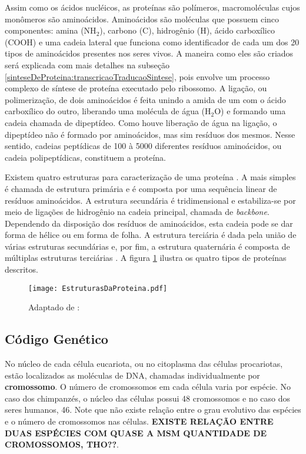 \indent Assim como os ácidos nucléicos, as proteínas são polímeros, macromoléculas cujos monômeros são aminoácidos. Aminoácidos são moléculas que possuem cinco componentes: amina (NH$_{2}$), carbono (C), hidrogênio (H), ácido carboxílico (COOH) e uma cadeia lateral que funciona como identificador de cada um dos 20 tipos de aminoácidos presentes nos seres vivos. A maneira como eles são criados será explicada com mais detalhes na subseção \ref{sinteseDeProteina:transcricaoTraducaoSintese}, pois envolve um processo complexo de síntese de proteína executado pelo ribossomo. A ligação, ou polimerização, de dois aminoácidos é feita unindo a amida de um com o ácido carboxílico do outro, liberando uma molécula de água (H$_{2}$O) e formando uma cadeia chamada de dipeptídeo. Como houve liberação de água na ligação, o dipeptídeo não é formado por aminoácidos, mas sim resíduos dos mesmos. Nesse sentido, cadeias peptídicas de 100 à 5000 diferentes resíduos aminoácidos, ou cadeia polipeptídicas,  constituem a proteína.

\indent Existem quatro estruturas para caracterização de uma proteína \cite{setubal97}. A mais simples é chamada de estrutura primária e é composta por uma sequência linear de resíduos aminoácidos. A estrutura secundária é tridimensional e estabiliza-se por meio de ligações de hidrogênio na cadeia principal, chamada de \textit{backbone}. Dependendo da disposição dos resíduos de aminoácidos, esta cadeia pode se dar forma de hélice ou em forma de folha. A estrutura terciária é dada pela união de várias estruturas secundárias e, por fim, a estrutura quaternária é composta de múltiplas estruturas terciárias \cite{drug09}. A figura \ref{fig:EstruturasDaProteina} ilustra os quatro tipos de proteínas descritos.

\begin{figure}[h]
    \centering
    \texttt{[image: EstruturasDaProteina.pdf]}
    \caption{Adaptado de : \cite{drug09} }
    \label{fig:EstruturasDaProteina}
\end{figure}

\subsection{Código Genético} \label{sinteseDeProteina:codigoGenetico} 

\indent No núcleo de cada célula eucariota, ou no citoplasma das células procariotas, estão localizados as moléculas de DNA, chamadas individualmente por \textbf{cromossomo}. O número de cromossomos em cada célula varia por espécie. No caso dos chimpanzés, o núcleo das células possui 48 cromossomos e no caso dos seres humanos, 46. Note que não existe relação entre o grau evolutivo das espécies e o número de cromossomos nas células. \textbf{EXISTE RELAÇÃO ENTRE DUAS ESPÉCIES COM QUASE A MSM QUANTIDADE DE CROMOSSOMOS, THO??}.

